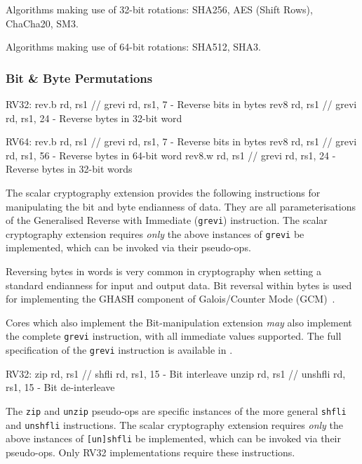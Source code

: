 Algorithms making use of 32-bit rotations:
SHA256, AES (Shift Rows), ChaCha20, SM3.

Algorithms making use of 64-bit rotations:
SHA512, SHA3.

\subsubsection{Bit \& Byte Permutations}
\label{sec:scalar:bitmanip:grev}

\begin{cryptobitmanipisa}
RV32:
    rev.b   rd, rs1 // grevi rd, rs1,  7 - Reverse bits in bytes
    rev8    rd, rs1 // grevi rd, rs1, 24 - Reverse bytes in 32-bit word

RV64:
    rev.b   rd, rs1 // grevi rd, rs1,  7 - Reverse bits in bytes
    rev8    rd, rs1 // grevi rd, rs1, 56 - Reverse bytes in 64-bit word
    rev8.w  rd, rs1 // grevi rd, rs1, 24 - Reverse bytes in 32-bit words
\end{cryptobitmanipisa}

The scalar cryptography extension provides the following instructions for
manipulating the bit and byte endianness of data.
They are all parameterisations of the Generalised Reverse with Immediate
({\tt grevi}) instruction.
The scalar cryptography extension requires {\em only} the above instances
of {\tt grevi} be implemented, which can be invoked via their pseudo-ops.

Reversing bytes in words is very common in cryptography when setting a
standard endianness for input and output data.
Bit reversal within bytes is used for implementing the GHASH  component
of Galois/Counter Mode (GCM)~\cite{nist:gcm}.

Cores which also implement the Bit-manipulation extension {\em may} also
implement the complete {\tt grevi} instruction, with all immediate values
supported.
The full specification of the {\tt grevi} instruction is available in
\cite[Section 2.2.2]{riscv:bitmanip:draft}.

\begin{cryptobitmanipisa}
RV32:
    zip     rd, rs1 // shfli   rd, rs1, 15 - Bit interleave
    unzip   rd, rs1 // unshfli rd, rs1, 15 - Bit de-interleave
\end{cryptobitmanipisa}

The {\tt zip} and {\tt unzip} pseudo-ops are specific instances of
the more general {\tt shfli} and {\tt unshfli} instructions.
The scalar cryptography extension requires {\em only} the above instances
of {\tt [un]shfli} be implemented, which can be invoked via their
pseudo-ops.
Only RV32 implementations require these instructions.

